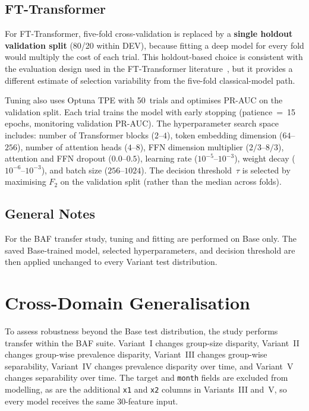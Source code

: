 \subsection{FT-Transformer}

For FT-Transformer, five-fold cross-validation is replaced by a \textbf{single holdout validation split} (80/20 within DEV), because fitting a deep model for every fold would multiply the cost of each trial. This holdout-based choice is consistent with the evaluation design used in the FT-Transformer literature~\cite{gorishniy2021revisiting}, but it provides a different estimate of selection variability from the five-fold classical-model path.

Tuning also uses Optuna TPE with 50~trials and optimises PR-AUC on the validation split.
Each trial trains the model with early stopping (patience~=~15 epochs, monitoring validation PR-AUC).
The hyperparameter search space includes: number of Transformer blocks ($2$--$4$), token embedding dimension ($64$--$256$), number of attention heads ($4$--$8$), FFN dimension multiplier ($2/3$--$8/3$), attention and FFN dropout ($0.0$--$0.5$), learning rate ($10^{-5}$--$10^{-3}$), weight decay ($10^{-6}$--$10^{-3}$), and batch size ($256$--$1024$).
The decision threshold~$\tau$ is selected by maximising $F_2$ on the validation split (rather than the median across folds).

\subsection{General Notes}

For the BAF transfer study, tuning and fitting are performed on Base only. The saved Base-trained model, selected hyperparameters, and decision threshold are then applied unchanged to every Variant test distribution.

\section{Cross-Domain Generalisation}
\label{sec:cross_domain}

To assess robustness beyond the Base test distribution, the study performs transfer within the BAF suite. Variant~I changes group-size disparity, Variant~II changes group-wise prevalence disparity, Variant~III changes group-wise separability, Variant~IV changes prevalence disparity over time, and Variant~V changes separability over time. The target and \texttt{month} fields are excluded from modelling, as are the additional \texttt{x1} and \texttt{x2} columns in Variants~III and~V, so every model receives the same 30-feature input.

